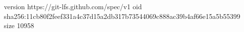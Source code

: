version https://git-lfs.github.com/spec/v1
oid sha256:11cb80f2feef331a4c37d15a2db317b73544069c888ac39b4af66e15a5b55399
size 10958
